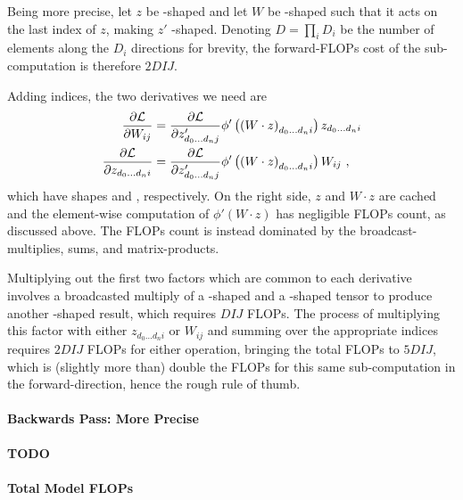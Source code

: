 \documentclass[11pt]{article}
\begin{document}
 Being more precise, let $ z $ be -shaped and let $ W $ be
 -shaped such that it acts on the last index of $ z $, making $ z' $
-shaped. Denoting $D=\prod _{ i } D _{ i } $ be the number of elements
along the $ D _{ i } $ directions for brevity, the forward-FLOPs cost of the sub-computation is
therefore $ 2DIJ$.


Adding indices, the two derivatives we need are
\begin{align}
    \frac{ \partial \mathcal{L}  }{ \partial W _{ ij } }&= \frac{ \partial \mathcal{L}  }{ \partial z '_{ d _{ 0 } \ldots  d _{ n }j } }\phi' \left (\left (  W \cdot z \right ) _{  d _{ 0 }\ldots d _{ n }i } \right )
z _{ d _{ 0 }\ldots  d _{ n } i } \nonumber\\
   \frac{  \partial \mathcal{L}  }{\partial  z _{ d _{ 0 }\ldots d _{ n }i } } &= \frac{ \partial \mathcal{L}
   }{ \partial z '_{ d _{ 0 } \ldots  d _{ n }j } }\phi' \left (\left (  W \cdot z \right ) _{  d _{
   0 }\ldots d _{ n }i } \right ) W _{ ij }\ ,
\end{align}
which have shapes  and , respectively. On the right
side, $ z $ and $ W \cdot  z $ are cached and the element-wise computation of $ \phi' \left ( W
\cdot z \right ) $ has negligible FLOPs count, as discussed above. The FLOPs count is instead
dominated by the broadcast-multiplies, sums, and matrix-products.

Multiplying out the first two factors which are common to each derivative involves a broadcasted
multiply of a -shaped and a -shaped tensor
to produce another -shaped result, which requires $ DIJ $ FLOPs.
The process of multiplying this factor with either $ z _{ d _{ 0 } \ldots d _{ n }i } $ or $ W _{ ij } $
and summing over the appropriate indices requires $ 2DIJ $ FLOPs for either operation, bringing the
total FLOPs to $ 5DIJ$, which is (slightly more than) double the FLOPs for this same
sub-computation in the forward-direction, hence the rough rule of thumb.


\paragraph{Backwards Pass: More Precise} \textbf{TODO}

\paragraph{Total Model FLOPs}
\end{document}
